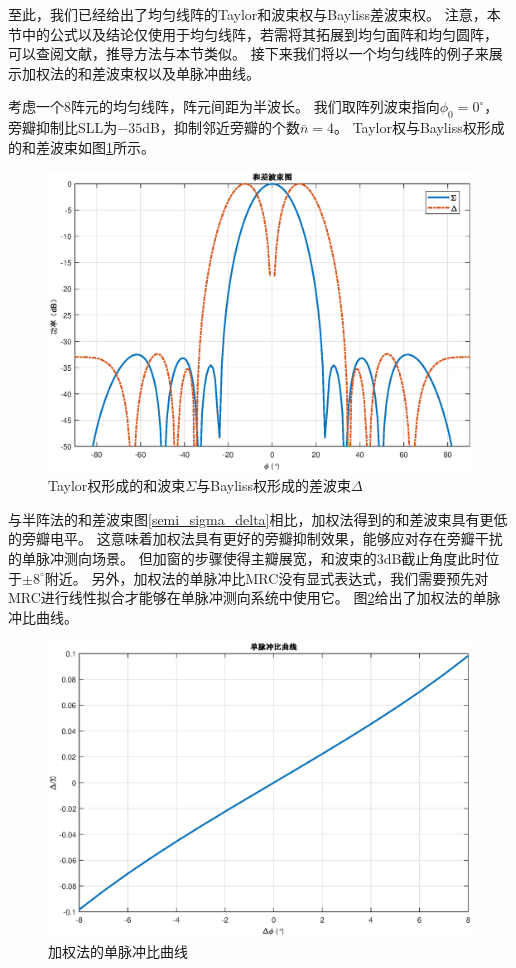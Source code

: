 \documentclass[master]{thesis-uestc}
\begin{document}
至此，我们已经给出了均匀线阵的Taylor和波束权与Bayliss差波束权。
注意，本节中的公式以及结论仅使用于均匀线阵，若需将其拓展到均匀面阵和均匀圆阵，
可以查阅文献\cite{Taylor,Bayliss}，推导方法与本节类似。
接下来我们将以一个均匀线阵的例子来展示加权法的和差波束权以及单脉冲曲线。

考虑一个$8$阵元的均匀线阵，阵元间距为半波长。
我们取阵列波束指向$\phi_0=0^\circ$，旁瓣抑制比SLL为$-35$dB，抑制邻近旁瓣的个数$\bar{n}=4$。
Taylor权与Bayliss权形成的和差波束如图\ref{Taylor_Bayliss}所示。
\begin{figure}[H]
    \includegraphics[scale=0.5]{pic/Taylor_Bayliss.eps}
    \caption{Taylor权形成的和波束$\Sigma$与Bayliss权形成的差波束$\Delta$}
    \label{Taylor_Bayliss}
\end{figure}

与半阵法的和差波束图\ref{semi_sigma_delta}相比，加权法得到的和差波束具有更低的旁瓣电平。
这意味着加权法具有更好的旁瓣抑制效果，能够应对存在旁瓣干扰的单脉冲测向场景。
但加窗的步骤使得主瓣展宽，和波束的3dB截止角度此时位于$\pm8^\circ$附近。
另外，加权法的单脉冲比MRC没有显式表达式，我们需要预先对MRC进行线性拟合才能够在单脉冲测向系统中使用它。
图\ref{Taylor_Bayliss_MRC}给出了加权法的单脉冲比曲线。
\begin{figure}[H]
    \includegraphics[scale=0.5]{pic/Taylor_Bayliss_MRC.eps}
    \caption{加权法的单脉冲比曲线}
    \label{Taylor_Bayliss_MRC}
\end{figure}
\end{document}

